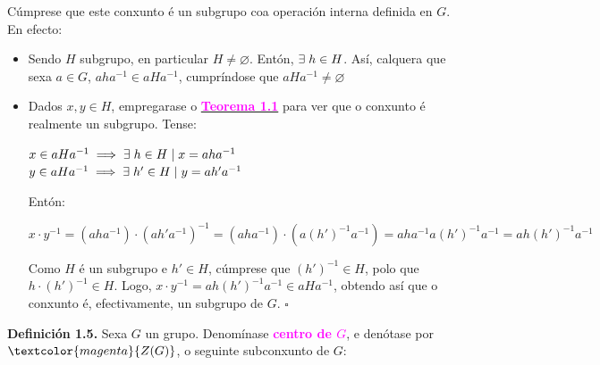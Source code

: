 \documentclass[twoside]{report}
\newcommand{\magbf}[1]{\textcolor{magenta}{\textbf{#1}}} %
\theoremstyle{mystyle}
\begin{document}
\begin{center}
\end{center}

\vspace{1mm}

\noindent Cúmprese que este conxunto é un subgrupo coa operación interna definida en $G$. En efecto:

\begin{itemize}
    \item Sendo $H$ subgrupo, en particular $H \neq \varnothing$. Entón, $\exists \hspace{1mm} h \in H$. Así, calquera que sexa $a \in G$, $aha^{-1} \in aHa^{-1}$, cumpríndose que $aHa^{-1} \neq \varnothing$
    \item Dados $x,y \in H$, empregarase o \hyperref[th1.1]{\magbf{Teorema 1.1}} para ver que o conxunto é realmente un subgrupo. Tense:
    
    $x \in aHa^{-1} \implies \exists \hspace{1mm} h \in H \hspace{1mm} | \hspace{1mm} x = aha^{-1}$\\
    $y \in aHa^{-1} \implies \exists \hspace{1mm} h' \in H \hspace{1mm} | \hspace{1mm} y = ah'a^{-1}$
    
    Entón:
    
    $x \cdot y^{-1} = (aha^{-1}) \cdot (ah'a^{-1})^{-1} = (aha^{-1}) \cdot (a(h')^{-1}a^{-1}) = aha^{-1}a(h')^{-1}a^{-1} = ah(h')^{-1}a^{-1}$ 
    
    Como $H$ é un subgrupo e $h' \in H$, cúmprese que $(h')^{-1} \in H$, polo que $h \cdot (h')^{-1} \in H$. Logo, $x \cdot y^{-1} = ah(h')^{-1}a^{-1} \in aHa^{-1}$, obtendo así que o conxunto é, efectivamente, un subgrupo de $G$. $\square$
\end{itemize}

\vspace{3mm}

\noindent \textbf{Definición 1.5.} Sexa $G$ un grupo. Denomínase \textcolor{magenta}{\textbf{centro de $G$}}, e denótase por $\textcolor{magenta}{Z(G)}$, o seguinte subconxunto de $G$:

\begin{center}
\end{center}
\end{document}
